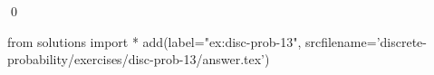 
\begin{ex} 
  \label{ex:disc-prob-13}
  
  \qed
\end{ex} 
\begin{python0}
from solutions import *
add(label="ex:disc-prob-13",
    srcfilename='discrete-probability/exercises/disc-prob-13/answer.tex') 
\end{python0}

